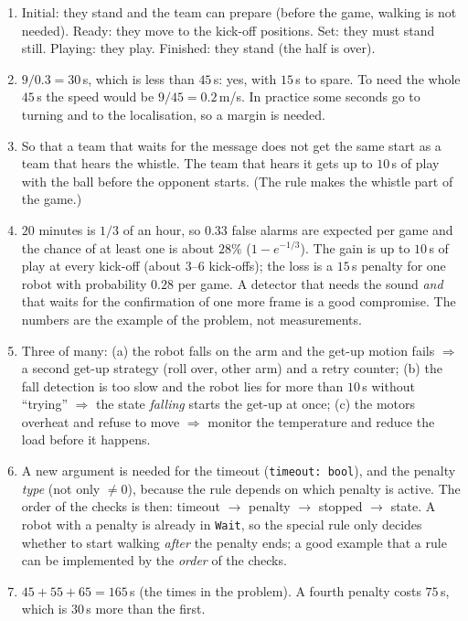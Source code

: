 \begin{enumerate}[label=\textbf{\ansnum.\arabic*}]
  \item Initial: they stand and the team can prepare (before the game, walking is not needed). Ready: they move to the kick-off positions. Set: they must stand still. Playing: they play. Finished: they stand (the half is over).
  \item $9/0.3=30$\,s, which is less than $45$\,s: yes, with $15$\,s to spare. To need the whole $45$\,s the speed would be $9/45=0.2$\,m/s. In practice some seconds go to turning and to the localisation, so a margin is needed.
  \item So that a team that waits for the message does not get the same start as a team that hears the whistle. The team that hears it gets up to $10$\,s of play with the ball before the opponent starts. (The rule makes the whistle part of the game.)
  \item $20$ minutes is $1/3$ of an hour, so $0.33$ false alarms are expected per game and the chance of at least one is about $28\%$ ($1-e^{-1/3}$). The gain is up to $10$\,s of play at every kick-off (about $3$--$6$ kick-offs); the loss is a $15$\,s penalty for one robot with probability $0.28$ per game. A detector that needs the sound \emph{and} that waits for the confirmation of one more frame is a good compromise. The numbers are the example of the problem, not measurements.
  \item Three of many: (a) the robot falls on the arm and the get-up motion fails $\Rightarrow$ a second get-up strategy (roll over, other arm) and a retry counter; (b) the fall detection is too slow and the robot lies for more than $10$\,s without ``trying'' $\Rightarrow$ the state \emph{falling} starts the get-up at once; (c) the motors overheat and refuse to move $\Rightarrow$ monitor the temperature and reduce the load before it happens.
  \item A new argument is needed for the timeout (\verb!timeout: bool!), and the penalty \emph{type} (not only $\ne0$), because the rule depends on which penalty is active. The order of the checks is then: timeout $\to$ penalty $\to$ stopped $\to$ state. A robot with a penalty is already in \verb!Wait!, so the special rule only decides whether to start walking \emph{after} the penalty ends; a good example that a rule can be implemented by the \emph{order} of the checks.
  \item $45+55+65=165$\,s (the times in the problem). A fourth penalty costs $75$\,s, which is $30$\,s more than the first.

\end{enumerate}
